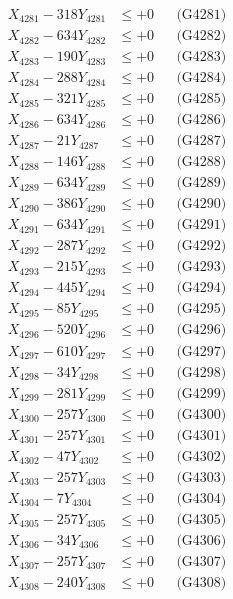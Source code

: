 \documentclass[a4paper,10pt]{article}
\begin{document}
{\begin{align}
\allowbreak
X_{4281} - 318Y_{4281} &\leq +0 && \text{(G4281)} \\
X_{4282} - 634Y_{4282} &\leq +0 && \text{(G4282)} \\
X_{4283} - 190Y_{4283} &\leq +0 && \text{(G4283)} \\
X_{4284} - 288Y_{4284} &\leq +0 && \text{(G4284)} \\
X_{4285} - 321Y_{4285} &\leq +0 && \text{(G4285)} \\
X_{4286} - 634Y_{4286} &\leq +0 && \text{(G4286)} \\
X_{4287} - 21Y_{4287} &\leq +0 && \text{(G4287)} \\
X_{4288} - 146Y_{4288} &\leq +0 && \text{(G4288)} \\
X_{4289} - 634Y_{4289} &\leq +0 && \text{(G4289)} \\
X_{4290} - 386Y_{4290} &\leq +0 && \text{(G4290)} \\
\allowbreak
X_{4291} - 634Y_{4291} &\leq +0 && \text{(G4291)} \\
X_{4292} - 287Y_{4292} &\leq +0 && \text{(G4292)} \\
X_{4293} - 215Y_{4293} &\leq +0 && \text{(G4293)} \\
X_{4294} - 445Y_{4294} &\leq +0 && \text{(G4294)} \\
X_{4295} - 85Y_{4295} &\leq +0 && \text{(G4295)} \\
X_{4296} - 520Y_{4296} &\leq +0 && \text{(G4296)} \\
X_{4297} - 610Y_{4297} &\leq +0 && \text{(G4297)} \\
X_{4298} - 34Y_{4298} &\leq +0 && \text{(G4298)} \\
X_{4299} - 281Y_{4299} &\leq +0 && \text{(G4299)} \\
X_{4300} - 257Y_{4300} &\leq +0 && \text{(G4300)} \\
\allowbreak
X_{4301} - 257Y_{4301} &\leq +0 && \text{(G4301)} \\
X_{4302} - 47Y_{4302} &\leq +0 && \text{(G4302)} \\
X_{4303} - 257Y_{4303} &\leq +0 && \text{(G4303)} \\
X_{4304} - 7Y_{4304} &\leq +0 && \text{(G4304)} \\
X_{4305} - 257Y_{4305} &\leq +0 && \text{(G4305)} \\
X_{4306} - 34Y_{4306} &\leq +0 && \text{(G4306)} \\
X_{4307} - 257Y_{4307} &\leq +0 && \text{(G4307)} \\
X_{4308} - 240Y_{4308} &\leq +0 && \text{(G4308)} \\

\end{align}}
\end{document}
